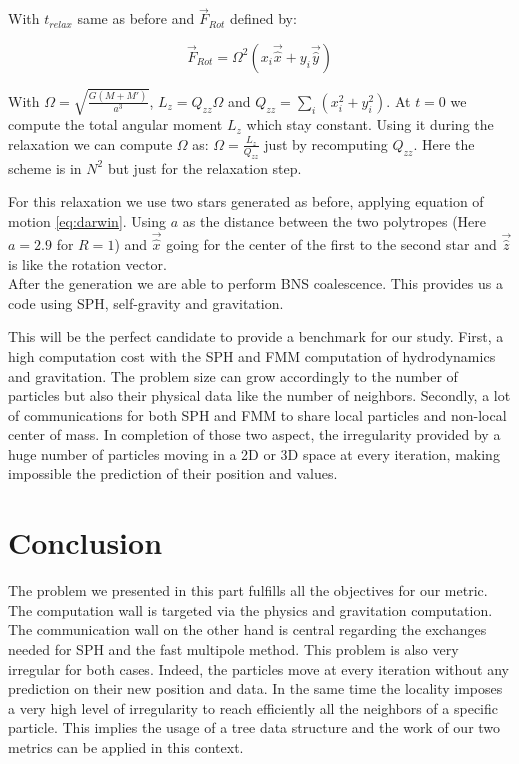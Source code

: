 With $t_{relax}$ same as before and $\vec{F}_{Rot}$ defined by:

\begin{equation}
\vec{F}_{Rot} = \Omega^2(x_i \vec{\hat{x}}+y_i\vec{\hat{y}})
\end{equation}

With $\Omega = \sqrt{\frac{G(M+M')}{a^3}}$, $L_z = Q_{zz}\Omega$ and $Q_{zz} = \sum_i(x_i^2+y_i^2)$. At $t=0$ we compute the total angular moment $L_z$ which stay constant.
Using it during the relaxation we can compute $\Omega$ as: $\Omega = \frac{L_z}{Q_{zz}}$ just by recomputing $Q_{zz}$.
Here the scheme is in $N^2$ but just for the relaxation step. 

For this relaxation we use two stars generated as before, applying equation of motion \ref{eq:darwin}.
Using $a$ as the distance between the two polytropes  (Here $a=2.9$ for $R=1$) and $\vec{\hat{x}}$ going for the center of the first to the second star and $\vec{\hat{z}}$ is like the rotation vector.\\

After the generation we are able to perform BNS coalescence. 
This provides us a code using SPH, self-gravity and gravitation. 

This will be the perfect candidate to provide a benchmark for our study.
First, a high computation cost with the SPH and FMM computation of hydrodynamics and gravitation. 
The problem size can grow accordingly to the number of particles but also their physical data like the number of neighbors. 
Secondly, a lot of communications for both SPH and FMM to share local particles and non-local center of mass. 
In completion of those two aspect, the irregularity provided by a huge number of particles moving in a 2D or 3D space at every iteration, making impossible the prediction of their position and values. 

\section{Conclusion}
The problem we presented in this part fulfills all the objectives for our metric. 
The computation wall is targeted via the physics and gravitation computation. 
The communication wall on the other hand is central regarding the exchanges needed for SPH and the fast multipole method. 
This problem is also very irregular for both cases. 
Indeed, the particles move at every iteration without any prediction on their new position and data. 
In the same time the locality imposes a very high level of irregularity to reach efficiently all the neighbors of a specific particle. 
This implies the usage of a tree data structure and the work of our two metrics can be applied in this context. 

